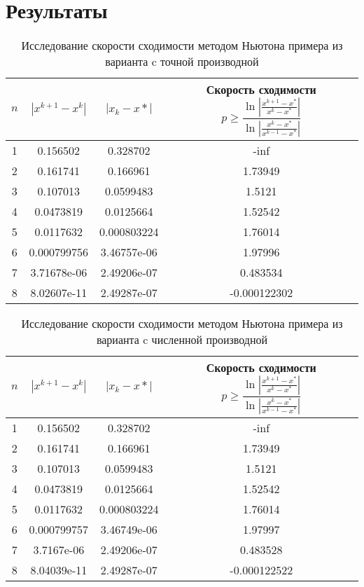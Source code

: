 \documentclass{article}
\begin{document}
    \section{Результаты}
    \begin{table}[H]
        \centering
        \caption{Исследование скорости сходимости методом Ньютона примера из варианта c точной производной}
        \begin{tabular}{|c|c|c|c|}
            \hline
            $n$ & $|x^{k+1} - x^k|$ & $ |x_k - x*|$ & Скорость сходимости $p \geqslant \dfrac{\ln | \frac{x^{k+1}-x^*}{x^k - x^*} |}{\ln |\frac{x^k -x^*}{x^{k-1} - x^*}|}$ \\
            \hline 
            1 & 0.156502 & 0.328702 & -inf \\ \hline
            2 & 0.161741 & 0.166961 & 1.73949 \\ \hline
            3 & 0.107013 & 0.0599483 & 1.5121 \\ \hline
            4 & 0.0473819 & 0.0125664 & 1.52542 \\ \hline
            5 & 0.0117632 & 0.000803224 & 1.76014 \\ \hline
            6 & 0.000799756 & 3.46757e-06 & 1.97996 \\ \hline
            7 & 3.71678e-06 & 2.49206e-07 & 0.483534 \\ \hline
            8 & 8.02607e-11 & 2.49287e-07 & -0.000122302 \\ \hline

        \end{tabular}
    \end{table}
    \begin{table}[H]
        \centering
        \caption{Исследование скорости сходимости методом Ньютона примера из варианта c численной производной}
        \begin{tabular}{|c|c|c|c|}
            \hline
            $n$ & $|x^{k+1} - x^k|$ & $ |x_k - x*|$ & Скорость сходимости $p \geqslant \dfrac{\ln | \frac{x^{k+1}-x^*}{x^k - x^*} |}{\ln |\frac{x^k -x^*}{x^{k-1} - x^*}|}$ \\
            \hline 
            1 & 0.156502 & 0.328702 & -inf \\ \hline
            2 & 0.161741 & 0.166961 & 1.73949 \\ \hline
            3 & 0.107013 & 0.0599483 & 1.5121 \\ \hline
            4 & 0.0473819 & 0.0125664 & 1.52542 \\ \hline
            5 & 0.0117632 & 0.000803224 & 1.76014 \\ \hline
            6 & 0.000799757 & 3.46749e-06 & 1.97997 \\ \hline
            7 & 3.7167e-06 & 2.49206e-07 & 0.483528 \\ \hline
            8 & 8.04039e-11 & 2.49287e-07 & -0.000122522 \\ \hline

        \end{tabular}
    \end{table}
\end{document}
